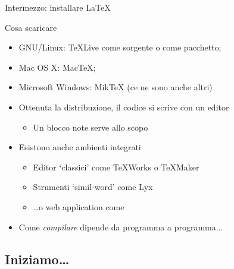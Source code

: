 \documentclass{beamer}
\begin{document}
\begin{frame}{Intermezzo: installare \LaTeX{}}

\begin{block}{Cosa scaricare}

\begin{itemize}
\item GNU/Linux: \TeX{}Live come sorgente o come pacchetto;
\item Mac OS X: Mac\TeX{};
\item Microsoft Windows: Mik\TeX{} (ce ne sono anche altri)
\end{itemize}
\end{block}

\begin{itemize}
\item Ottenuta la distribuzione, il codice si scrive con un editor
	\begin{itemize}
	\item Un  blocco note serve allo scopo
	\end{itemize}
\item Esistono anche ambienti integrati
	\begin{itemize}
	\item Editor `classici' come \TeX{}Works o \TeX{}Maker
	\item Strumenti `simil-word' come Lyx
	\item \ldots o web application come \wllogo
	\end{itemize}
\item Come \emph{compilare} dipende da programma a programma...
\end{itemize}

\end{frame}

\subsection{Iniziamo\ldots}
\begin{frame}[fragile]{\insertsubsection}
\end{frame}
\end{document}
